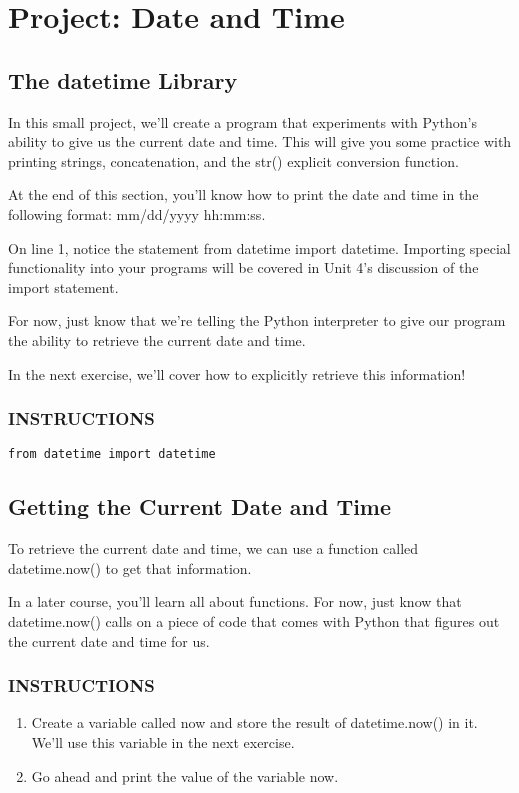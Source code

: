 \documentclass[12pt,a4paper,final,twoside,onecolumn,titlepage]{book}
\begin{document}
\section{Project: Date and Time}
\subsection{The datetime Library}
In this small project, we'll create a program that experiments with Python's ability to give us the current date and time. This will give you some practice with printing strings, concatenation, and the str() explicit conversion function.

At the end of this section, you'll know how to print the date and time in the following format: mm/dd/yyyy hh:mm:ss.

On line 1, notice the statement from datetime import datetime. Importing special functionality into your programs will be covered in Unit 4's discussion of the import statement.

For now, just know that we're telling the Python interpreter to give our program the ability to retrieve the current date and time.

In the next exercise, we'll cover how to explicitly retrieve this information!

\subsubsection{INSTRUCTIONS}
\begin{lstlisting}
from datetime import datetime
\end{lstlisting}

\subsection{Getting the Current Date and Time}
To retrieve the current date and time, we can use a function called datetime.now() to get that information.

In a later course, you'll learn all about functions. For now, just know that datetime.now() calls on a piece of code that comes with Python that figures out the current date and time for us.

\subsubsection{INSTRUCTIONS}
\begin{enumerate}
\item Create a variable called now and store the result of datetime.now() in it. We'll use this variable in the next exercise.
\item Go ahead and print the value of the variable now.
\end{enumerate}
\end{document}
